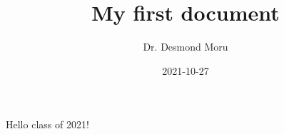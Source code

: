 \documentclass{article}
\title{My first document}
\date{2021-10-27}
\author{Dr. Desmond Moru}
\begin{document}
	\maketitle
	\newpage 
	Hello class of 2021!
\end{document}

